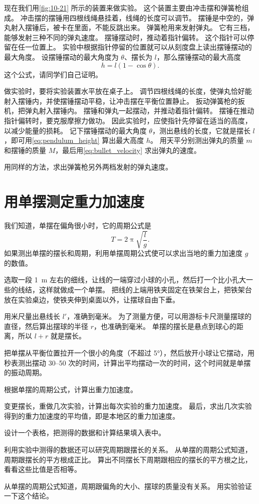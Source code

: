 现在我们用\cref{fig:10-21} 所示的装置来做实验。
这个装置主要由冲击摆和弹簧枪组成。
冲击摆的摆锤用四根线绳悬挂着，线绳的长度可以调节。
摆锤是中空的，弹丸射入摆锤后，被卡在里面，不能反跳出来。
弹簧枪用来发射弹丸。
它有三档，能够发射三种不同的弹丸速度。
摆锤摆动时，推动着指针偏转。
这个指针可以停留在任一位置上。
实验中根据指针停留的位置就可以从刻度盘上读出摆锤摆动的最大角度。
设摆锤摆动的最大角度为 $\theta$、摆长为 $l$，那么摆锤摆动的最大高度
\begin{equation}
  \label{eq:pendulum_height}
  h=l(1-\cos\theta).
\end{equation}
这个公式，请同学们自己证明。

做实验时，要将实验装置水平放在桌子上。
调节四根线绳的长度，使弹丸恰好能射入摆锤内，并使摆锤摆动平稳，让冲击摆在平衡位置静止。
扳动弹簧枪的扳机，把弹丸射入摆锤内。
摆锤和弹丸一起摆动，并推动着指针偏转。
摆锤在推动指针偏转时，要克服摩擦力做功。
因此实验时，应使指针先停留在适当的高度，以减少能量的损耗。
记下摆锤摆动的最大角度 $\theta$，测出悬线的长度，它就是摆长 $l$，即可用\cref{eq:pendulum_height} 算出最大高度 $h$。
用天平分别测出弹丸的质量 $m$ 和摆锤的质量 $M$，最后用\cref{eq:bullet_velocity} 求出弹丸的速度。

用同样的方法，求出弹簧枪另外两档发射的弹丸速度。

\section{用单摆测定重力加速度}
我们知道，单摆在偏角很小时，它的周期公式是
\[T=2\uppi\sqrt{\frac{l}{g}}.\]
如果测出单摆的摆长和周期，利用单摆周期公式使可以求出当地的重力加速度 $g$ 的数值。

选取一段 \qty{1}{m} 左右的细线，让线的一端穿过小球的小孔，然后打一个比小孔大一些的线结，这样就做成一个单摆。
把线的上端用铁夹固定在铁架台上，把铁架台放在实验桌边，使铁夹伸到桌面以外，让摆球自由下垂。

用米尺量出悬线长 $l'$，准确到毫米。
为了测量方便，可以用游标卡尺测量摆球的直径，然后算出摆球的半径 $r$，也准确到毫米。
单摆的摆长是悬点到球心的距离，所以 $l+r$ 就是摆长。

把单摆从平衡位置拉开一个很小的角度（不超过 \ang{5}），然后放开小球让它摆动，用秒表测出摆动 \numrange{30}{50} 次的时间，计算出平均摆动一次的时间，这个时间就是单摆的振动周期。

根据单摆的周期公式，计算出重力加速度。

变更摆长，重做几次实验，计算出每次实验的重力加速度。
最后，求出几次实验得到的重力加速度的平均值，即是本地区的重力加速度。

设计一个表格，把测得的数据和计算结果填入表中。

利用实验中测得的数据还可以研究周期跟摆长的关系。
从单摆的周期公式知道，周期跟摆长的平方根成正比。
算出不同摆长下周期跟相应的摆长的平方根之比，看看这些比值是否相等。

从单摆的周期公式知道，周期跟偏角的大小、摆球的质量没有关系。
用实验验证一下这个结论。